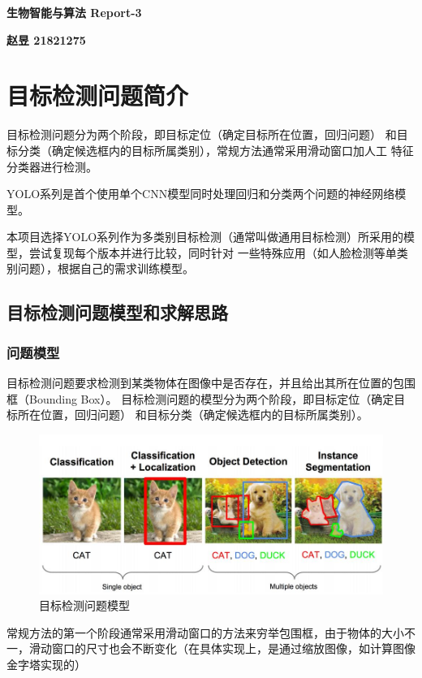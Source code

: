 \documentclass[a4paper, notitlepage]{article}
\begin{document}
\setlength{\parindent}{0pt}
\begin{center}
	\LARGE\textbf{生物智能与算法 Report-3}
\end{center}
\vspace{1em}

\begin{center}
	\textbf{赵昱 21821275}
\end{center}

\setlength{\parindent}{2em}

\section{目标检测问题简介}
目标检测问题分为两个阶段，即目标定位（确定目标所在位置，回归问题）
和目标分类（确定候选框内的目标所属类别），常规方法通常采用滑动窗口加人工
特征分类器进行检测。

YOLO系列\cite{1,2,3}是首个使用单个CNN模型同时处理回归和分类两个问题的神经网络模型。

本项目选择YOLO系列作为多类别目标检测（通常叫做通用目标检测）所采用的模型，尝试复现每个版本并进行比较，同时针对
一些特殊应用（如人脸检测等单类别问题），根据自己的需求训练模型。

\subsection{目标检测问题模型和求解思路}
\subsubsection{问题模型}
目标检测问题要求检测到某类物体在图像中是否存在，并且给出其所在位置的包围框（Bounding Box）。
目标检测问题的模型分为两个阶段，即目标定位（确定目标所在位置，回归问题） 和目标分类（确定候选框内的目标所属类别）。
\begin{figure}[H]
    \centering
    \includegraphics[scale=0.4]{fig_problem_model}
    \caption{目标检测问题模型}
    \label{fig:example}
\end{figure}
常规方法的第一个阶段通常采用滑动窗口的方法来穷举包围框，由于物体的大小不一，滑动窗口的尺寸也会不断变化（在具体实现上，是通过缩放图像，如计算图像金字塔实现的）
\end{document}
